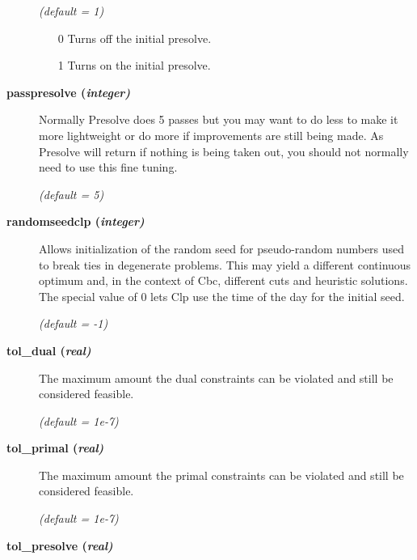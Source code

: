 \begin{description}
\textsl{(default = 1)}
\begin{itemize}
\item[0] 
Turns off the initial presolve.
\item[1] 
Turns on the initial presolve.
\end{itemize}

\item[\label{passpresolve}\hypertarget{passpresolve}
{\textbf{passpresolve (\slshape{integer})}}]\hspace{1.0in}

Normally Presolve does 5 passes but you may want to do less to make
it more lightweight or do more if improvements are still being made.
As Presolve will return if nothing is being taken out, you should
not normally need to use this fine tuning.

\textsl{(default = 5)}

\item[\label{randomseedclp}\hypertarget{randomseedclp}
{\textbf{randomseedclp (\slshape{integer})}}]\hspace{1.0in}

Allows initialization of the random seed for pseudo-random numbers used to break ties in degenerate problems.
This may yield a different continuous optimum and, in the context of Cbc, different cuts and heuristic solutions.
The special value of 0 lets Clp use the time of the day for the initial seed.

\textsl{(default = -1)}

\item[\label{tol_dual}\hypertarget{tol_dual}
{\textbf{tol\_dual (\slshape{real})}}]\hspace{1.0in}

The maximum amount the dual constraints can be violated and still be considered feasible.

\textsl{(default = 1e-7)}

\item[\label{tol_primal}\hypertarget{tol_primal}
{\textbf{tol\_primal (\slshape{real})}}]\hspace{1.0in}

The maximum amount the primal constraints can be violated and still be considered feasible.

\textsl{(default = 1e-7)}

\item[\label{tol_presolve}\hypertarget{tol_presolve}
{\textbf{tol\_presolve (\slshape{real})}}]\hspace{1.0in}


\end{description}
